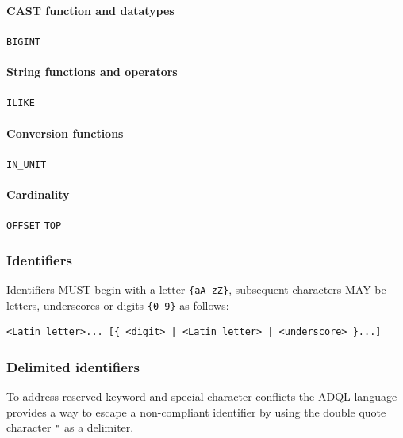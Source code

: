 \documentclass[11pt,a4paper]{ivoa}
\begin{document}
\begin{raggedright}
\paragraph{CAST function and datatypes}
\texttt{BIGINT}
\end{raggedright}

\begin{raggedright}
\paragraph{String functions and operators}
\texttt{ILIKE}
\end{raggedright}

\begin{raggedright}
\paragraph{Conversion functions}
\texttt{IN\_UNIT}
\end{raggedright}

\begin{raggedright}
\paragraph{Cardinality}
\texttt{OFFSET} \texttt{TOP}
\end{raggedright}


\subsubsection{Identifiers}
\label{sec:adql.identifiers}

Identifiers MUST begin with a letter
\verb:{aA-zZ}:, subsequent characters MAY be letters, underscores or
digits \verb:{0-9}: as follows:

\begin{verbatim}
<Latin_letter>... [{ <digit> | <Latin_letter> | <underscore> }...]
\end{verbatim}

\subsubsection{Delimited identifiers}
\label{sec:adql.escape}

To address reserved keyword and special character conflicts the ADQL language
provides a way to escape a non-compliant identifier by using the double
quote character \verb:": as a delimiter.
\end{document}
